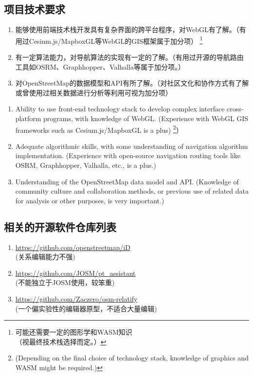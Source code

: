 \documentclass{beamer}
\begin{document}
\subsection{项目技术要求}

\begin{frame}
    \begin{enumerate}
        \item 能够使用前端技术栈开发具有复杂界面的跨平台程序，对WebGL有了解。（有用过Cesium.js/MapboxGL等WebGL的GIS框架属于加分项）
        \footnote{可能还需要一定的图形学和WASM知识\\（视最终技术栈选择而定。）}
        \item 有一定算法能力，对导航算法的实现有一定的了解。（有用过开源的导航路由工具如OSRM、Graphhopper、Valhalla等属于加分项。）
        \item 对OpenStreetMap的数据模型和API有所了解。（对社区文化和协作方式有了解或曾使用过相关数据进行分析等利用可视为加分项）
    \end{enumerate}
\end{frame}

\begin{frame}
    \begin{enumerate}
        \item Ability to use front-end technology stack to develop complex interface cross-platform programs, with knowledge of WebGL. (Experience with WebGL GIS frameworks such as Cesium.js/MapboxGL is a plus)
        \footnote{(Depending on the final choice of technology stack, knowledge of graphics and WASM might be required.)}）
        \item Adequate algorithmic skills, with some understanding of navigation algorithm implementation. (Experience with open-source navigation routing tools like OSRM, Graphhopper, Valhalla, etc., is a plus.)
        \item Understanding of the OpenStreetMap data model and API. (Knowledge of community culture and collaboration methods, or previous use of related data for analysis or other purposes, is very important.)
    \end{enumerate}
\end{frame}


\subsection{相关的开源软件仓库列表}

\begin{frame}
    \begin{enumerate}
        \item \url{https://github.com/openstreetmap/iD} \\
        (关系编辑能力不强)
        \item \url{https://github.com/JOSM/pt_assistant} \\
        (不能独立于JOSM使用，较笨重)
        \item \url{https://github.com/Zaczero/osm-relatify} \\
        (一个偏实验性的编辑器原型，不适合大量编辑)
    \end{enumerate}
\end{frame}
\end{document}
